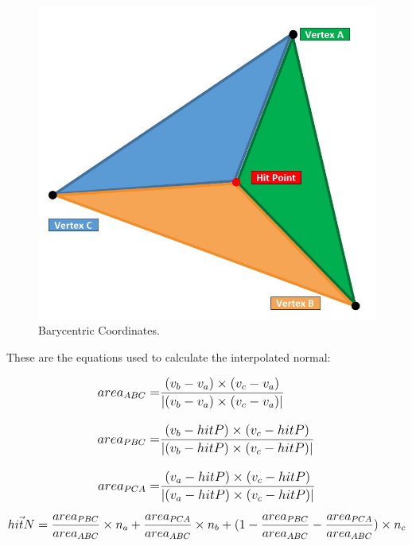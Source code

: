 \begin{figure}[!htb]
    \centering
    \includegraphics[scale=0.30]{Images/Barycentric_Coordinates}
    \caption{\label{fig:bi}Barycentric Coordinates.}
\end{figure}

These are the equations used to calculate the interpolated normal:

\begin{subequations}
    \begin{flalign}
        \mathlarger{area_{ABC} =} & 
        \mathlarger{\frac{(v_b - v_a) \times (v_c - v_a)}{|(v_b - v_a) \times (v_c - v_a)|}}\\[10pt]
        \mathlarger{area_{PBC} =} & 
        \mathlarger{\frac{(v_b - hitP) \times (v_c - hitP)}{|(v_b - hitP) \times (v_c - hitP)|}}\\[10pt]
        \mathlarger{area_{PCA} =} & 
        \mathlarger{\frac{(v_a - hitP) \times (v_c - hitP)}{|(v_a - hitP) \times (v_c - hitP)|}}
    \end{flalign}
\end{subequations}  

\begin{equation}
    \mathlarger{\vec{hitN} = 
        \frac{area_{PBC}}{area_{ABC}} \times n_a + 
        \frac{area_{PCA}}{area_{ABC}} \times n_b + 
        (1 - \frac{area_{PBC}}{area_{ABC}} - \frac{area_{PCA}}{area_{ABC}}) \times n_c}\\
\end{equation}  

